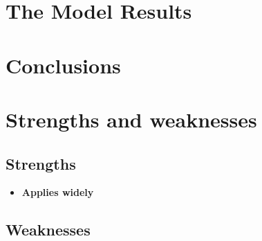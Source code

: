 \documentclass{mcmthesis}
\begin{document}
\section{The Model Results}




\section{Conclusions}


\section{Strengths and weaknesses}


\subsection{Strengths}
\begin{itemize}
\item \textbf{Applies widely}\\


\end{itemize}
\subsection{Weaknesses}
\end{document}
